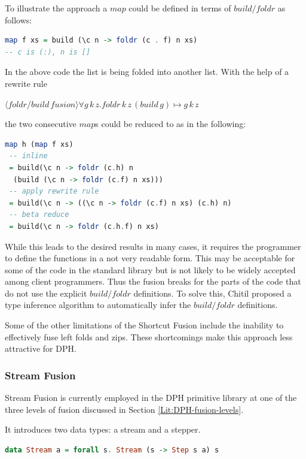 \documentclass[preamble.tex]{subfiles}
\begin{document}
To illustrate the approach a $map$ could be defined in terms of $build/foldr$ as follows:

\begin{lstlisting}[basicstyle={\ttfamily},language=Haskell]
map f xs = build (\c n -> foldr (c . f) n xs)
-- c is (:), n is []
\end{lstlisting}


In the above code the list is being folded into another list. With the help of a rewrite rule

$\langle foldr/build\, fusion \rangle\forall g\, k\, z.foldr\, k\, z\,(build\, g)\mapsto g\, k\, z$

the two consecutive $map$s could be reduced to as in the following:

\begin{lstlisting}[basicstyle={\ttfamily},language=Haskell]
map h (map f xs)
 -- inline
 = build(\c n -> foldr (c.h) n 
  (build (\c n -> foldr (c.f) n xs)))
 -- apply rewrite rule
 = build(\c n -> ((\c n -> foldr (c.f) n xs) (c.h) n)
 -- beta reduce
 = build(\c n -> foldr (c.h.f) n xs)
\end{lstlisting}


While this leads to the desired results in many cases, it requires the programmer to define the functions in a not very readable form. This may be acceptable for some of the code in the standard library but is not likely to be widely accepted among client programmers. Thus the fusion breaks for the parts of the code that do not use the explicit $build/foldr$ definitions. To solve this, Chitil proposed a type inference algorithm to automatically infer the $build/foldr$ definitions\cite{Chi99}.

Some of the other limitations of the Shortcut Fusion include the inability to effectively fuse left folds and zips. These shortcomings make this approach less attractive for DPH.


\subsubsection{Stream Fusion}

Stream Fusion \cite{CLS07,CSL06} is currently employed in the DPH primitive library at one of the three levels of fusion discussed in Section \vref{Lit:DPH-fusion-levels}.

It introduces two data types: a stream and a stepper. 

\begin{lstlisting}[basicstyle={\ttfamily},language=Haskell]
data Stream a = forall s. Stream (s -> Step s a) s
\end{lstlisting}
\end{document}
